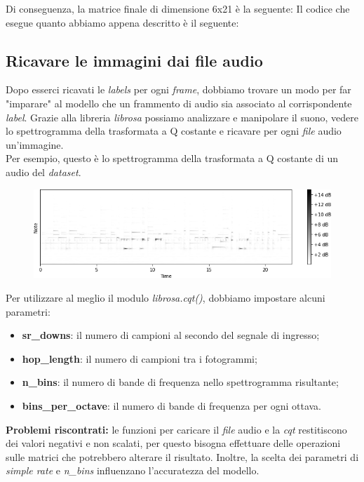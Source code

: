 \newline
Di conseguenza, la matrice finale di dimensione 6x21 è la seguente:
\vspace*{2ex}
\vspace*{2ex}
\noindent Il codice che esegue quanto abbiamo appena descritto è il seguente:
\vspace*{2ex}
\subsection{Ricavare le immagini dai file audio}
Dopo esserci ricavati le \textit{labels} per ogni \textit{frame}, dobbiamo trovare un modo per far "imparare" al modello che un frammento di audio sia associato al corrispondente \textit{label}.
Grazie alla libreria \textit{librosa} possiamo analizzare e manipolare il suono, vedere lo spettrogramma della trasformata a Q costante e ricavare per ogni \textit{file} audio un'immagine.\\
Per esempio, questo è lo spettrogramma della trasformata a Q costante di un audio del \textit{dataset}.
\begin{figure}[H]
	\centering
	\includegraphics[scale=0.60]{./images/img7.png}
\end{figure}
\noindent Per utilizzare al meglio il modulo \textit{librosa.cqt()}, dobbiamo impostare alcuni parametri:
\begin{itemize}
	\item \textbf{sr\_downs}: il numero di campioni al secondo del segnale di ingresso;
	\item \textbf{hop\_length}: il numero di campioni tra i fotogrammi;
	\item \textbf{n\_bins}: il numero di bande di frequenza nello spettrogramma risultante;
	\item \textbf{bins\_per\_octave}: il numero di bande di frequenza per ogni ottava.
\end{itemize}
\textbf{Problemi riscontrati:} le funzioni per caricare il \textit{file} audio e la \textit{cqt} restitiscono dei valori negativi e non scalati, per questo bisogna effettuare delle operazioni sulle matrici che potrebbero alterare il risultato. Inoltre, la scelta dei parametri di \textit{simple rate} e \textit{n\_bins} influenzano l'accuratezza del modello. \\
